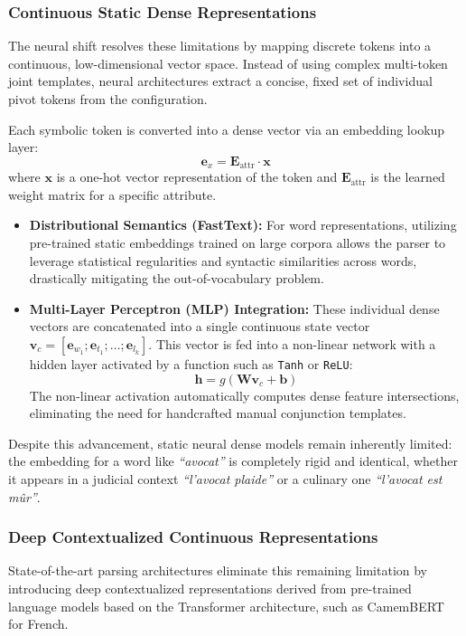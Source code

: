 \documentclass[12pt,a4paper]{article}
\begin{document}
\subsubsection{Continuous Static Dense Representations}
The neural shift resolves these limitations by mapping discrete tokens into a continuous, low-dimensional vector space. Instead of using complex multi-token joint templates, neural architectures extract a concise, fixed set of individual pivot tokens from the configuration.

Each symbolic token is converted into a dense vector via an embedding lookup layer:
\begin{equation}
    \mathbf{e}_x = \mathbf{E}_{\text{attr}} \cdot \mathbf{x}
\end{equation}
where $\mathbf{x}$ is a one-hot vector representation of the token and $\mathbf{E}_{\text{attr}}$ is the learned weight matrix for a specific attribute. 
\begin{itemize}
    \item \textbf{Distributional Semantics (FastText):} For word representations, utilizing pre-trained static embeddings trained on large corpora allows the parser to leverage statistical regularities and syntactic similarities across words, drastically mitigating the out-of-vocabulary problem.
    \item \textbf{Multi-Layer Perceptron (MLP) Integration:} These individual dense vectors are concatenated into a single continuous state vector $\mathbf{v}_c = [\mathbf{e}_{w_1}; \mathbf{e}_{t_1}; \dots; \mathbf{e}_{l_k}]$. This vector is fed into a non-linear network with a hidden layer activated by a function such as \texttt{Tanh} or \texttt{ReLU}:
    \begin{equation}
        \mathbf{h} = g(\mathbf{W} \mathbf{v}_c + \mathbf{b})
    \end{equation}
    The non-linear activation automatically computes dense feature intersections, eliminating the need for handcrafted manual conjunction templates.
\end{itemize}

Despite this advancement, static neural dense models remain inherently limited: the embedding for a word like \textit{``avocat''} is completely rigid and identical, whether it appears in a judicial context \textit{``l'avocat plaide''} or a culinary one \textit{``l'avocat est mûr''}.

\subsubsection{Deep Contextualized Continuous Representations}
State-of-the-art parsing architectures eliminate this remaining limitation by introducing deep contextualized representations derived from pre-trained language models based on the Transformer architecture, such as CamemBERT for French.
\end{document}
